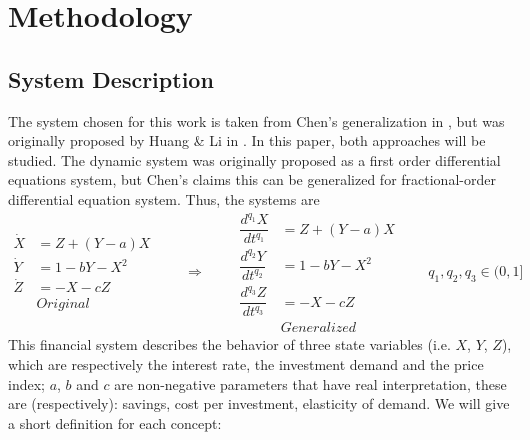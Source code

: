 \section{Methodology}
  \subsection{System Description}
    The system chosen for this work is taken from Chen's generalization in \cite{main}, but was originally proposed by Huang \& Li in \cite{huang1993theory}. In this paper, both approaches will be studied. The dynamic system was originally proposed as a first order differential equations system, but Chen's claims this can be generalized for fractional-order differential equation system. Thus, the systems are
    \begin{equation}
        \begin{array}{ll}
            \dot{X}&=Z+(Y-a)X\\
            \dot{Y}&=1-bY-X^2\\
            \dot{Z}&=-X-cZ\\
            &\textit{Original}
        \end{array}\qquad\Rightarrow\qquad
        \begin{array}{ll}
            \dfrac{d^{q_1}X}{dt^{q_1}}&=Z+(Y-a)X\\
            \dfrac{d^{q_2}Y}{dt^{q_2}}&=1-bY-X^2\\
            \dfrac{d^{q_3}Z}{dt^{q_3}}&=-X-cZ\\
            &\textit{Generalized}
        \end{array} \qquad q_1,q_2,q_3\in(0,1]
        \label{eq:main}
    \end{equation}
    This financial system describes the behavior of three state variables (i.e. $X$, $Y$, $Z$), which are respectively the interest rate, the investment demand and the price index; $a$, $b$ and $c$ are non-negative parameters that have real interpretation, these are (respectively): savings, cost per investment, elasticity of demand. We will give a short definition for each concept:
